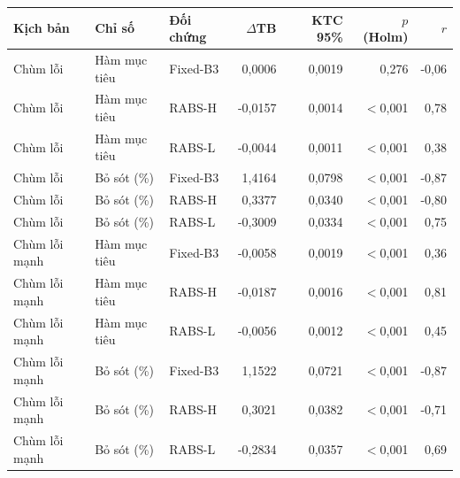 \begin{tabular}{lllrrrr}
\hline
Kịch bản & Chỉ số & Đối chứng & $\Delta$TB & KTC 95\% & $p$ (Holm) & $r$ \\
\hline
Chùm lỗi & Hàm mục tiêu & Fixed-B3 & 0,0006 & 0,0019 & 0,276 & -0,06 \\
Chùm lỗi & Hàm mục tiêu & RABS-H & -0,0157 & 0,0014 & $<$0,001 & 0,78 \\
Chùm lỗi & Hàm mục tiêu & RABS-L & -0,0044 & 0,0011 & $<$0,001 & 0,38 \\
Chùm lỗi & Bỏ sót (\%) & Fixed-B3 & 1,4164 & 0,0798 & $<$0,001 & -0,87 \\
Chùm lỗi & Bỏ sót (\%) & RABS-H & 0,3377 & 0,0340 & $<$0,001 & -0,80 \\
Chùm lỗi & Bỏ sót (\%) & RABS-L & -0,3009 & 0,0334 & $<$0,001 & 0,75 \\
\hline
Chùm lỗi mạnh & Hàm mục tiêu & Fixed-B3 & -0,0058 & 0,0019 & $<$0,001 & 0,36 \\
Chùm lỗi mạnh & Hàm mục tiêu & RABS-H & -0,0187 & 0,0016 & $<$0,001 & 0,81 \\
Chùm lỗi mạnh & Hàm mục tiêu & RABS-L & -0,0056 & 0,0012 & $<$0,001 & 0,45 \\
Chùm lỗi mạnh & Bỏ sót (\%) & Fixed-B3 & 1,1522 & 0,0721 & $<$0,001 & -0,87 \\
Chùm lỗi mạnh & Bỏ sót (\%) & RABS-H & 0,3021 & 0,0382 & $<$0,001 & -0,71 \\
Chùm lỗi mạnh & Bỏ sót (\%) & RABS-L & -0,2834 & 0,0357 & $<$0,001 & 0,69 \\
\hline
\end{tabular}
